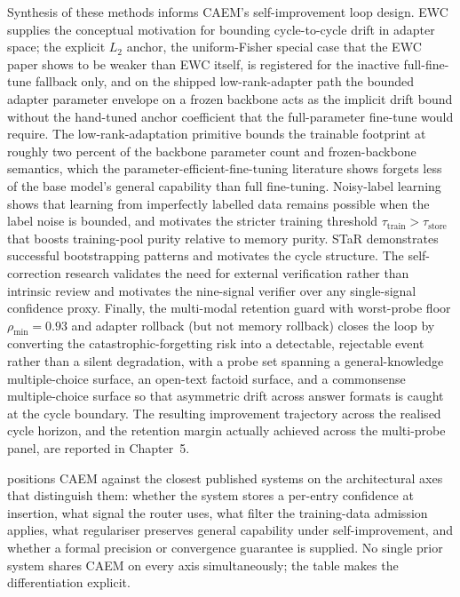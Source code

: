 Synthesis of these methods informs CAEM's self-improvement loop design. EWC supplies the conceptual motivation for bounding cycle-to-cycle drift in adapter space; the explicit $L_{2}$ anchor, the uniform-Fisher special case that the EWC paper shows to be weaker than EWC itself, is registered for the inactive full-fine-tune fallback only, and on the shipped low-rank-adapter path the bounded adapter parameter envelope on a frozen backbone acts as the implicit drift bound without the hand-tuned anchor coefficient that the full-parameter fine-tune would require. The low-rank-adaptation primitive bounds the trainable footprint at roughly two percent of the backbone parameter count and frozen-backbone semantics, which the parameter-efficient-fine-tuning literature shows forgets less of the base model's general capability than full fine-tuning. Noisy-label learning shows that learning from imperfectly labelled data remains possible when the label noise is bounded, and motivates the stricter training threshold $\tau_{\text{train}} > \tau_{\text{store}}$ that boosts training-pool purity relative to memory purity. STaR demonstrates successful bootstrapping patterns and motivates the cycle structure. The self-correction research validates the need for external verification rather than intrinsic review and motivates the nine-signal verifier over any single-signal confidence proxy. Finally, the multi-modal retention guard with worst-probe floor $\rho_{\min} = 0.93$ and adapter rollback (but not memory rollback) closes the loop by converting the catastrophic-forgetting risk into a detectable, rejectable event rather than a silent degradation, with a probe set spanning a general-knowledge multiple-choice surface, an open-text factoid surface, and a commonsense multiple-choice surface so that asymmetric drift across answer formats is caught at the cycle boundary. The resulting improvement trajectory across the realised cycle horizon, and the retention margin actually achieved across the multi-probe panel, are reported in Chapter~5.

 positions CAEM against the closest published systems on the architectural axes that distinguish them: whether the system stores a per-entry confidence at insertion, what signal the router uses, what filter the training-data admission applies, what regulariser preserves general capability under self-improvement, and whether a formal precision or convergence guarantee is supplied. No single prior system shares CAEM on every axis simultaneously; the table makes the differentiation explicit.


